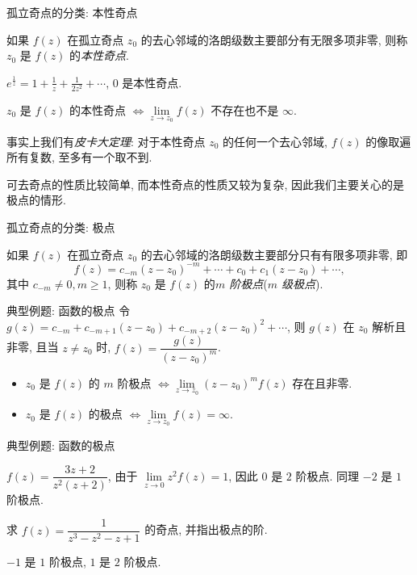 \begin{frame}{孤立奇点的分类: 本性奇点}
\begin{definition}
如果 $f(z)$ 在孤立奇点 $z_0$ 的去心邻域的洛朗级数主要部分有无限多项非零, 则称 $z_0$ 是 $f(z)$ 的\emph{本性奇点}.
\end{definition}
\begin{example}
$\displaystyle e^{\frac1z}=1+\frac1z+\frac1{2z^2}+\cdots$, $0$ 是本性奇点.
\end{example}

\begin{theorem}
$z_0$ 是 $f(z)$ 的本性奇点 $\iff\lim\limits_{z\to z_0}f(z)$ 不存在也不是 $\infty$.
\end{theorem}

\onslide<+->
事实上我们有\emph{皮卡大定理}: 对于本性奇点 $z_0$ 的任何一个去心邻域, $f(z)$ 的像取遍所有复数, 至多有一个取不到.

\onslide<+->
可去奇点的性质比较简单, 而本性奇点的性质又较为复杂, 因此我们主要关心的是极点的情形.
\end{frame}


\begin{frame}{孤立奇点的分类: 极点}
\begin{definition}
如果 $f(z)$ 在孤立奇点 $z_0$ 的去心邻域的洛朗级数主要部分只有有限多项非零, 即
\[f(z)=c_{-m}(z-z_0)^{-m}+\cdots+c_0+c_1(z-z_0)+\cdots,\]
其中 $c_{-m}\neq 0,m\ge 1$, 则称 $z_0$ 是 $f(z)$ 的\emph{$m$ 阶极点}(\emph{$m$ 级极点}).
\end{definition}
\end{frame}


\begin{frame}{典型例题: 函数的极点}
\onslide<+->
令 $g(z)=c_{-m}+c_{-m+1}(z-z_0)+c_{-m+2}(z-z_0)^2+\cdots$, 则 $g(z)$ 在 $z_0$ 解析且非零,
\onslide<+->
且当 $z\neq z_0$ 时, $f(z)=\dfrac{g(z)}{(z-z_0)^m}$.

\begin{theorem}
\begin{itemize}
\item $z_0$ 是 $f(z)$ 的 $m$ 阶极点 $\iff\lim\limits_{z\to z_0}(z-z_0)^mf(z)$ 存在且非零.
\item $z_0$ 是 $f(z)$ 的极点 $\iff\lim\limits_{z\to z_0}f(z)=\infty$.
\end{itemize}
\end{theorem}
\end{frame}


\begin{frame}{典型例题: 函数的极点}
\begin{example}
$f(z)=\dfrac{3z+2}{z^2(z+2)}$,
\onslide<+->
由于 $\lim\limits_{z\to 0}z^2f(z)=1$, 因此 $0$ 是 $2$ 阶极点.
\onslide<+->
同理 $-2$ 是 $1$ 阶极点.
\end{example}

\begin{exercise}
求 $f(z)=\dfrac1{z^3-z^2-z+1}$ 的奇点, 并指出极点的阶.
\end{exercise}
\begin{answer}
$-1$ 是 $1$ 阶极点, $1$ 是 $2$ 阶极点.
\end{answer}
\end{frame}


